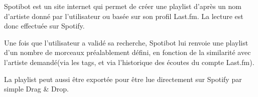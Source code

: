 Spotibot est un site internet qui permet de créer une playlist d'après un nom
d'artiste donné par l'utilisateur ou basée sur son profil Last.fm. La lecture
est donc effectuée sur Spotify.

Une fois que l'utilisateur a validé sa recherche, Spotibot lui renvoie une
playlist d'un nombre de morceaux préalablement défini, en fonction de la
similarité avec l'artiste demandé(via les tags, et via l'historique des écoutes
du compte Last.fm).

La playlist peut aussi être exportée pour être lue directement sur Spotify par
simple Drag & Drop.
